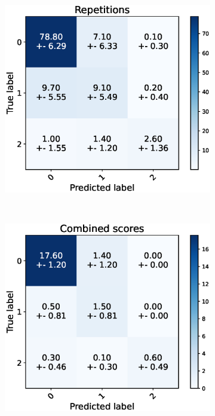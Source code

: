 \begin{figure}
  \centering
  \begin{subfigure}[t]{0.48\textwidth}
      \includegraphics[width=\textwidth]{files/figs/res/kmfp/cnf-reps.eps}
      \caption{}
      \label{fig:kmfp-cnf-reps}
  \end{subfigure}
  ~
  \begin{subfigure}[t]{0.48\textwidth}
      \includegraphics[width=\textwidth]{files/figs/res/kmfp/cnf-combined.eps}
      \caption{}
      \label{fig:kmfp-cnf-comb}
  \end{subfigure}


\end{figure}
